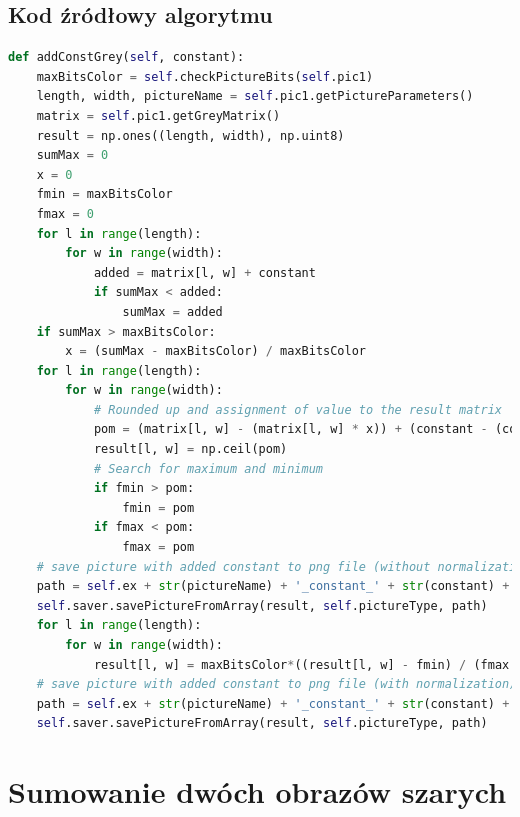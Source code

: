 \documentclass[a4paper,12pt, titlepage]{report}
\begin{document}
\subsection*{Kod źródłowy algorytmu}
\begin{lstlisting}[language=Python]
def addConstGrey(self, constant):
    maxBitsColor = self.checkPictureBits(self.pic1)
    length, width, pictureName = self.pic1.getPictureParameters()
    matrix = self.pic1.getGreyMatrix()
    result = np.ones((length, width), np.uint8)
    sumMax = 0
    x = 0
    fmin = maxBitsColor
    fmax = 0
    for l in range(length):
        for w in range(width):
            added = matrix[l, w] + constant
            if sumMax < added:
                sumMax = added
    if sumMax > maxBitsColor:
        x = (sumMax - maxBitsColor) / maxBitsColor
    for l in range(length):
        for w in range(width):
            # Rounded up and assignment of value to the result matrix
            pom = (matrix[l, w] - (matrix[l, w] * x)) + (constant - (constant * x))
            result[l, w] = np.ceil(pom)
            # Search for maximum and minimum
            if fmin > pom:
                fmin = pom
            if fmax < pom:
                fmax = pom
    # save picture with added constant to png file (without normalization)
    path = self.ex + str(pictureName) + '_constant_' + str(constant) + '.png'
    self.saver.savePictureFromArray(result, self.pictureType, path)
    for l in range(length):
        for w in range(width):
            result[l, w] = maxBitsColor*((result[l, w] - fmin) / (fmax - fmin))
    # save picture with added constant to png file (with normalization)
    path = self.ex + str(pictureName) + '_constant_' + str(constant) + '_normalized.png'
    self.saver.savePictureFromArray(result, self.pictureType, path)
\end{lstlisting}

\section{Sumowanie dwóch obrazów szarych}
\end{document}
